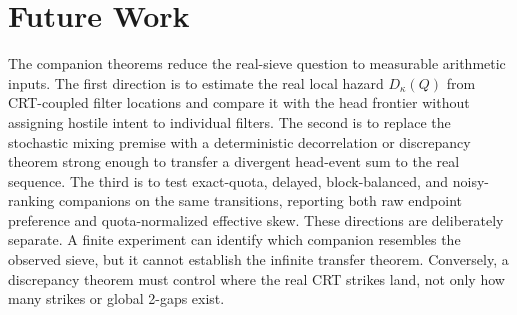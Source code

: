 \section{Future Work}
The companion theorems reduce the real-sieve question to measurable arithmetic inputs. The first direction is to estimate the real local hazard $D_{\kappa}(Q)$ from CRT-coupled filter locations and compare it with the head frontier without assigning hostile intent to individual filters. The second is to replace the stochastic mixing premise with a deterministic decorrelation or discrepancy theorem strong enough to transfer a divergent head-event sum to the real sequence. The third is to test exact-quota, delayed, block-balanced, and noisy-ranking companions on the same transitions, reporting both raw endpoint preference and quota-normalized effective skew.
These directions are deliberately separate. A finite experiment can identify which companion resembles the observed sieve, but it cannot establish the infinite transfer theorem. Conversely, a discrepancy theorem must control where the real CRT strikes land, not only how many strikes or global 2-gaps exist.

